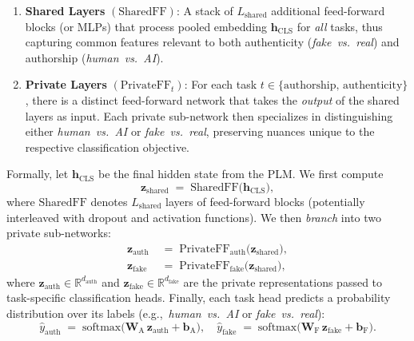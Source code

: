 \documentclass[electronics,article,accept,pdftex,moreauthors,electronics]{Definitions/mdpi}
\begin{document}
\begin{enumerate}
    \item \textbf{Shared Layers} $(\mathrm{SharedFF})$: A stack of $L_\mathrm{shared}$ additional feed-forward blocks (or MLPs) that process pooled embedding $\mathbf{h}_\text{CLS}$ 
    for \emph{all} tasks, thus capturing common features relevant to both authenticity 
    (\textit{fake~vs.~real}) and authorship (\textit{human~vs.~AI}).
    
    \item \textbf{Private Layers} $(\mathrm{PrivateFF}_{t})$: For each task $t \in \{\text{authorship, authenticity}\}$, 
    there is a distinct feed-forward network that takes the \emph{output} of the shared layers 
    as input. Each private sub-network then specializes in distinguishing either \textit{human~vs.~AI} 
    or \textit{fake~vs.~real}, preserving nuances unique to the respective classification objective.
\end{enumerate}

Formally, let $\mathbf{h}_\mathrm{CLS}$ be the final hidden state from the PLM. We first compute
\begin{equation}
\label{eq:shared_ff}
\mathbf{z}_\mathrm{shared} \;=\; \mathrm{SharedFF}\bigl(\mathbf{h}_\mathrm{CLS}\bigr),
\end{equation}
where $\mathrm{SharedFF}$ denotes $L_\mathrm{shared}$ layers of feed-forward blocks (potentially interleaved 
with dropout and activation functions). We then \emph{branch} into two private sub-networks:
\begin{align}
\mathbf{z}_\mathrm{auth} \;&=\; \mathrm{PrivateFF}_{\mathrm{auth}}\!\bigl(\mathbf{z}_\mathrm{shared}\bigr),\\[6pt]
\mathbf{z}_\mathrm{fake} \;&=\; \mathrm{PrivateFF}_{\mathrm{fake}}\!\bigl(\mathbf{z}_\mathrm{shared}\bigr),
\end{align}
where $\mathbf{z}_\mathrm{auth} \in \mathbb{R}^{d_\mathrm{auth}}$ and $\mathbf{z}_\mathrm{fake} \in \mathbb{R}^{d_\mathrm{fake}}$ 
are the private representations passed to task-specific classification heads. Finally, each task head 
predicts a probability distribution over its labels (e.g.,~\textit{human~vs.~AI} or \textit{fake~vs.~real}):
\begin{equation}
\hat{y}_\mathrm{auth} \;=\; \mathrm{softmax}\bigl(\mathbf{W}_\mathrm{A}\,\mathbf{z}_\mathrm{auth} 
+ \mathbf{b}_\mathrm{A}\bigr), 
\quad
\hat{y}_\mathrm{fake} \;=\; \mathrm{softmax}\bigl(\mathbf{W}_\mathrm{F}\,\mathbf{z}_\mathrm{fake} 
+ \mathbf{b}_\mathrm{F}\bigr).
\end{equation}
\end{document}
